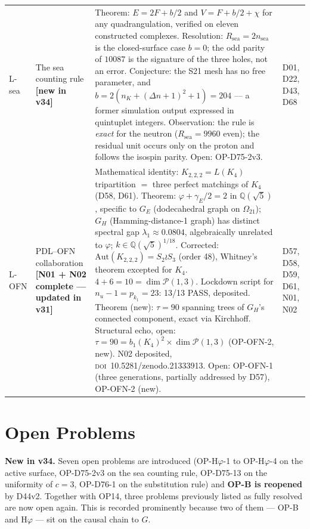 \documentclass[11pt,a4paper]{article}
\newcommand{\Rsea}{R_{\mathrm{sea}}}
\theoremstyle{plain}
\theoremstyle{definition}
\theoremstyle{remark}
\begin{document}
\begin{longtable}{L{0.6cm}L{3.0cm}L{5.5cm}L{4.0cm}}
L-sea & The sea counting rule \textbf{[new in v34]} & \textcolor{proofblue}{Theorem}: $E=2F+b/2$ and $V=F+b/2+\chi$ for any quadrangulation, verified on eleven constructed complexes. \textcolor{proofblue}{Resolution}: $\Rsea=2n_{\mathrm{sea}}$ is the closed-surface case $b=0$; the odd parity of $10087$ is the signature of the three holes, not an error. \textcolor{conjecturegreen}{Conjecture}: the S21 mesh has no free parameter, and $b=2(n_K+(\Delta n+1)^2+1)=204$ --- a former simulation output expressed in quintuplet integers. \textcolor{proofblue}{Observation}: the rule is \emph{exact} for the neutron ($\Rsea=9960$ even); the residual unit occurs only on the proton and follows the isospin parity. Open: OP-D75-2v3. & D01, D22, D43, D68\\[0.3em]
L-OFN & PDL--OFN collaboration \textbf{[N01 + N02 complete --- updated in v31]} & \textcolor{proofblue}{Mathematical identity}: $K_{2,2,2}=L(K_4)$ tripartition $=$ three perfect matchings of $K_4$ (D58, D61). \textcolor{proofblue}{Theorem}: $\varphi+\gamma_E/2=2$ in $\mathbb{Q}(\sqrt{5})$, specific to $G_E$ (dodecahedral graph on $\Omega_{21}$); $G_H$ (Hamming-distance-1 graph) has distinct spectral gap $\lambda_1\approx0.0804$, algebraically unrelated to $\varphi$; $k\in\mathbb{Q}(\sqrt{5})^{1/18}$. \textcolor{proofblue}{Corrected}: $\mathrm{Aut}(K_{2,2,2})=S_2\wr S_3$ (order 48), Whitney's theorem excepted for $K_4$. $4+6=10=\dim\mathcal{P}(1,3)$. Lockdown script for $n_u-1=p_{k_1}=23$: 13/13 PASS, deposited. \textcolor{proofblue}{Theorem} (new): $\tau=90$ spanning trees of $G_H$'s connected component, exact via Kirchhoff. \textcolor{openproblemred}{Structural echo, open}: $\tau=90=b_1(K_4)^2\times\dim\mathcal P(1,3)$ (OP-OFN-2, new). N02 deposited, \textsc{doi}~10.5281/zenodo.21333913. Open: OP-OFN-1 (three generations, partially addressed by D57), OP-OFN-2 (new). & D57, D58, D59, D61, N01, N02\\[0.3em]
\end{longtable}

\section{Open Problems}
\label{sec:openproblems}

\textcolor{negativered}{\textbf{New in v34.}} Seven open problems are introduced (OP-H$\varphi$-1 to OP-H$\varphi$-4 on the active surface, OP-D75-2v3 on the sea counting rule, OP-D75-13 on the uniformity of $c=3$, OP-D76-1 on the substitution rule) and \textbf{OP-B is reopened} by D44v2. Together with OP14, three problems previously listed as fully resolved are now open again. This is recorded prominently because two of them --- OP-B and H$\varphi$ --- sit on the causal chain to $G$.
\end{document}
